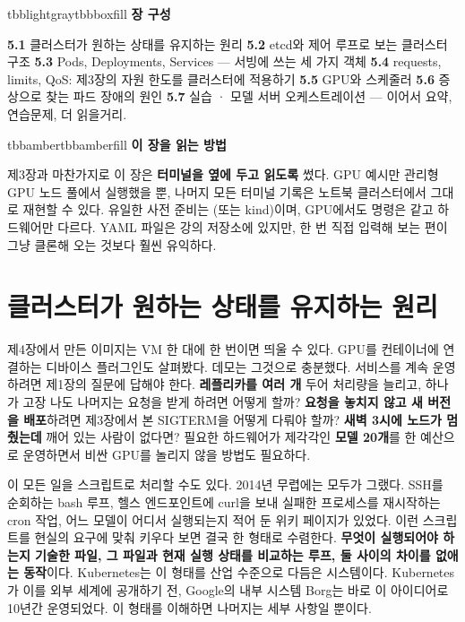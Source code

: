 \vspace{5.0pt}

\begin{calloutbox}{tbblightgray}{tbbboxfill}
{\normalsize\bfseries\color{tbbink}장 구성}\par\vspace{3pt}
\textbf{5.1} 클러스터가 원하는 상태를 유지하는 원리    \textbf{5.2} etcd와 제어 루프로 보는 클러스터 구조    \textbf{5.3} Pods, Deployments, Services — 서빙에 쓰는 세 가지 객체    \textbf{5.4} requests, limits, QoS: 제3장의 자원 한도를 클러스터에 적용하기    \textbf{5.5} GPU와 스케줄러    \textbf{5.6} 증상으로 찾는 파드 장애의 원인    \textbf{5.7} 실습 · 모델 서버 오케스트레이션 — 이어서 요약, 연습문제, 더 읽을거리.
\end{calloutbox}

\vspace{3.0pt}

\begin{calloutbox}{tbbamber}{tbbamberfill}
{\normalsize\bfseries\color{tbbamberdark}이 장을 읽는 방법}\par\vspace{3pt}
제3장과 마찬가지로 이 장은 \textbf{터미널을 옆에 두고 읽도록} 썼다. GPU 예시만 관리형 GPU 노드 풀에서 실행했을 뿐, 나머지 모든 터미널 기록은 노트북 클러스터에서 그대로 재현할 수 있다. 유일한 사전 준비는 (또는 kind)이며, GPU에서도 명령은 같고 하드웨어만 다르다. YAML 파일은 강의 저장소에 있지만, 한 번 직접 입력해 보는 편이 그냥 클론해 오는 것보다 훨씬 유익하다.
\end{calloutbox}

\section{클러스터가 원하는 상태를 유지하는 원리}

제4장에서 만든 이미지는 VM 한 대에  한 번이면 띄울 수 있다. GPU를 컨테이너에 연결하는 디바이스 플러그인도 살펴봤다. 데모는 그것으로 충분했다. 서비스를 계속 운영하려면 제1장의 질문에 답해야 한다. \textbf{레플리카를 여러 개} 두어 처리량을 늘리고, 하나가 고장 나도 나머지는 요청을 받게 하려면 어떻게 할까? \textbf{요청을 놓치지 않고 새 버전을 배포}하려면 제3장에서 본 SIGTERM을 어떻게 다뤄야 할까? \textbf{새벽 3시에 노드가 멈췄는데} 깨어 있는 사람이 없다면? 필요한 하드웨어가 제각각인 \textbf{모델 20개}를 한 예산으로 운영하면서 비싼 GPU를 놀리지 않을 방법도 필요하다.

이 모든 일을 스크립트로 처리할 수도 있다. 2014년 무렵에는 모두가 그랬다. SSH를 순회하는 bash 루프, 헬스 엔드포인트에 curl을 보내 실패한 프로세스를 재시작하는 cron 작업, 어느 모델이 어디서 실행되는지 적어 둔 위키 페이지가 있었다. 이런 스크립트를 현실의 요구에 맞춰 키우다 보면 결국 한 형태로 수렴한다. \textbf{무엇이 실행되어야 하는지 기술한 파일, 그 파일과 현재 실행 상태를 비교하는 루프, 둘 사이의 차이를 없애는 동작}이다. Kubernetes는 이 형태를 산업 수준으로 다듬은 시스템이다. Kubernetes가 이를 외부 세계에 공개하기 전, Google의 내부 시스템 Borg는 바로 이 아이디어로 10년간 운영되었다. 이 형태를 이해하면 나머지는 세부 사항일 뿐이다.

